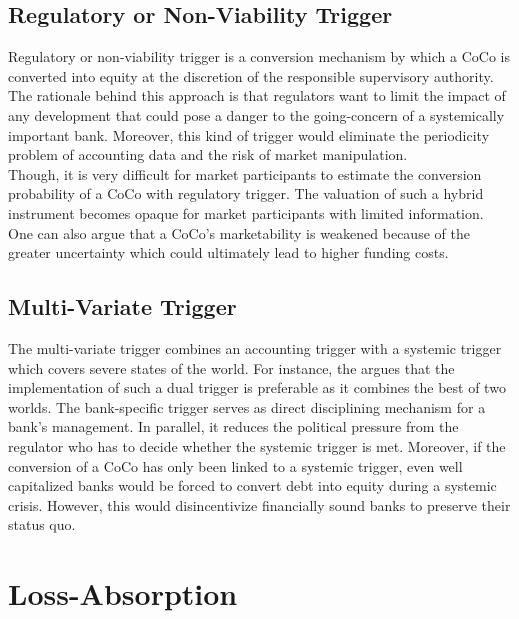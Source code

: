 \subsection{Regulatory or Non-Viability Trigger} \label{regulatorytrigger}

Regulatory or non-viability trigger is a conversion mechanism by which a CoCo is converted into equity at the discretion of the responsible supervisory authority. The rationale behind this approach is that regulators want to limit the impact of any development that could pose a danger to the going-concern of a systemically important bank. \citep{erismann2015pricing} Moreover, this kind of trigger would eliminate the periodicity problem of accounting data and the risk of market manipulation.\\ 

Though, it is very difficult for market participants to estimate the conversion probability of a CoCo with regulatory trigger. The valuation of such a hybrid instrument becomes opaque for market participants with limited information. \citep{alvemar2012modelling} One can also argue that a CoCo's marketability is weakened because of the greater uncertainty which could ultimately lead to higher funding costs. \citep{de2014handbook} 

\subsection{Multi-Variate Trigger} \label{multivariatetrigger}

The multi-variate trigger combines an accounting trigger with a systemic trigger which covers severe states of the world. For instance, the \citet{squam2009expedited} argues that the implementation of such a dual trigger is preferable as it combines the best of two worlds. The bank-specific trigger serves as direct disciplining mechanism for a bank's management. In parallel, it reduces the political pressure from the regulator who has to decide whether the systemic trigger is met. Moreover, if the conversion of a CoCo has only been linked to a systemic trigger, even well capitalized banks would be forced to convert debt into equity during a systemic crisis. However, this would disincentivize financially sound banks to preserve their status quo.


\section{Loss-Absorption} \label{lossabsorption}

